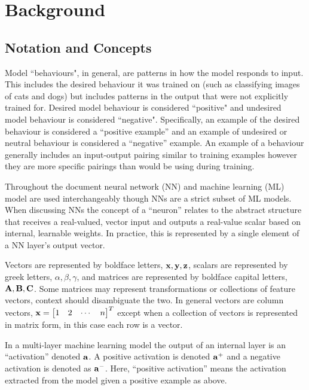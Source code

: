 \chapter{Background}

\section{Notation and Concepts}

Model ``behaviours", in general, are patterns in how the model responds to input.
This includes the desired behaviour it was trained on (such as classifying images of cats and dogs) but includes patterns in the output that were not explicitly trained for.
Desired model behaviour is considered ``positive" and undesired model behaviour is considered ``negative".
Specifically, an example of the desired behaviour is considered a ``positive example'' and an example of undesired or neutral behaviour is considered a ``negative'' example.
An example of a behaviour generally includes an input-output pairing similar to training examples however they are more specific pairings than would be using during training.

Throughout the document neural network (NN) and machine learning (ML) model are used interchangeably though NNs are a strict subset of ML models.
When discussing NNs the concept of a ``neuron'' relates to the abstract structure that receives a real-valued, vector input and outputs a real-value scalar based on internal, learnable weights.
In practice, this is represented by a single element of a NN layer's output vector.

Vectors are represented by boldface letters, $\mathbf{x}, \mathbf{y}, \mathbf{z}$, scalars are represented by greek letters, $\alpha, \beta, \gamma$, and matrices are represented by boldface capital letters, $\mathbf{A}, \mathbf{B}, \mathbf{C}$.
Some matrices may represent transformations or collections of feature vectors, context should disambiguate the two.
In general vectors are column vectors, $\vx = \begin{bmatrix*}
    1 & 2 & \cdots & n
\end{bmatrix*}^T$ except when a collection of vectors is represented in matrix form, in this case each row is a vector.

In a multi-layer machine learning model the output of an internal layer is an ``activation'' denoted $\mathbf{a}$.
A positive activation is denoted $\mathbf{a}^+$ and a negative activation is denoted as $\mathbf{a}^-$. Here, ``positive activation'' means the activation extracted from the model given a positive example as above.

